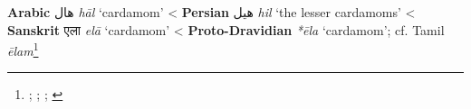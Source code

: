 \begin{etymology}\label{ety:hal}
\textbf{Arabic} {هال} \textit{hāl} `cardamom'
< \textbf{Persian} {هیل} \textit{hil} `the lesser cardamoms'
< \textbf{Sanskrit} {एला} \textit{elā} `cardamom'
< \textbf{Proto-Dravidian} \textit{*ēla} `cardamom'; cf. Tamil \textit{ēlam}\footnote{\textcite[1223]{wehr_dictionary_1976}; \textcite[1521]{steingass_comprehensive_1892}; \textcite[104]{dalby_dangerous_2000}; \textcite[87]{burrow_dravidian_1984}}
\end{etymology}